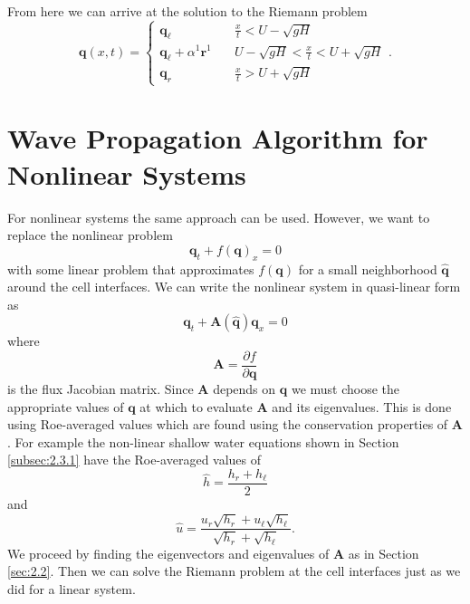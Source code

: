 \documentclass[twoside]{bsu-ms}
\begin{document}
From here we can arrive at the solution to the Riemann problem
\begin{equation}\label{eq:2.27}
    \mathbf{q}(x,t)=\begin{cases}
        \mathbf{q}_{\ell}&\frac{x}{t}< U-\sqrt{gH}\\
        \mathbf{q}_{\ell}+\alpha^1\mathbf{r}^{1}\quad&U-\sqrt{gH}<\frac{x}{t}<U+\sqrt{gH}\\
        \mathbf{q}_{r}&\frac{x}{t}>U+\sqrt{gH}
    \end{cases}.
\end{equation}

\section{Wave Propagation Algorithm for Nonlinear Systems}\label{sec:2.3}
For nonlinear systems the same approach can be used. However, we want to replace the nonlinear problem 
\begin{equation*}
    \mathbf{q}_{t}+f(\mathbf{q})_{x}=0
\end{equation*}
with some linear problem that approximates $f(\mathbf{q})$ for a small neighborhood $\mathbf{\widehat{q}}$ around the cell interfaces. We can write the nonlinear system in quasi-linear form as
\begin{equation}\label{eq:2.28}
    \mathbf{q}_{t}+\mathbf{A}(\mathbf{\widehat{q}})\mathbf{q}_{x}=0
\end{equation}
where 
\begin{equation}\label{eq:2.29}
    \mathbf{A}=\frac{\partial f}{\partial \mathbf{q}}
\end{equation} is the flux Jacobian matrix. Since $\mathbf{A}$ depends on $\mathbf{q}$ we must choose the appropriate values of $\mathbf{q}$ at which to evaluate $\mathbf{A}$ and its eigenvalues. This is done using Roe-averaged values which are found using the conservation properties of $\mathbf{A}$. For example the non-linear shallow water equations shown in Section \ref{subsec:2.3.1} have the Roe-averaged values of 
\begin{equation}\label{eq:2.30}
\widehat{h} = \frac{h_{r}+h_{\ell}}{2}
\end{equation}
and 
\begin{equation}\label{eq:2.31}
    \widehat{u}=\frac{u_{r}\sqrt{h_{r}}+u_{\ell}\sqrt{h_{\ell}}}{\sqrt{h_{r}}+\sqrt{h_{\ell}}}.
\end{equation}
We proceed by finding the eigenvectors and eigenvalues of $\mathbf{A}$ as in Section \ref{sec:2.2}. Then we can solve the Riemann problem at the cell interfaces just as we did for a linear system.
\end{document}

